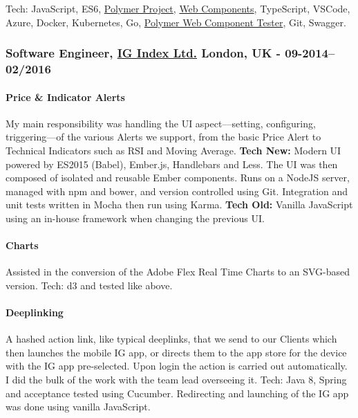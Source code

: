 \documentclass[
  a4paper,
]{article}
\begin{document}
Tech: JavaScript, ES6, \href{https://www.polymer-project.org}{Polymer
Project}, \href{https://www.webcomponents.org}{Web Components},
TypeScript, VSCode, Azure, Docker, Kubernetes, Go,
\href{https://github.com/Polymer/web-component-tester}{Polymer Web
Component Tester}, Git, Swagger.

\hypertarget{software-engineer-ig-index-ltd.-london-uk---09-2014022016}{%
\subsubsection{\texorpdfstring{Software Engineer,
\href{https://www.ig.com/uk}{IG Index Ltd.} London, UK -
09-2014--02/2016}{Software Engineer, IG Index Ltd. London, UK - 09-2014--02/2016}}\label{software-engineer-ig-index-ltd.-london-uk---09-2014022016}}

\hypertarget{price-indicator-alerts}{%
\paragraph{Price \& Indicator Alerts}\label{price-indicator-alerts}}

My main responsibility was handling the UI aspect---setting,
configuring, triggering---of the various Alerts we support, from the
basic Price Alert to Technical Indicators such as RSI and Moving
Average. \textbf{Tech New:} Modern UI powered by ES2015 (Babel),
Ember.js, Handlebars and Less. The UI was then composed of isolated and
reusable Ember components. Runs on a NodeJS server, managed with npm and
bower, and version controlled using Git. Integration and unit tests
written in Mocha then run using Karma. \textbf{Tech Old:} Vanilla
JavaScript using an in-house framework when changing the previous UI.

\hypertarget{charts}{%
\paragraph{Charts}\label{charts}}

Assisted in the conversion of the Adobe Flex Real Time Charts to an
SVG-based version. Tech: d3 and tested like above.

\hypertarget{deeplinking}{%
\paragraph{Deeplinking}\label{deeplinking}}

A hashed action link, like typical deeplinks, that we send to our
Clients which then launches the mobile IG app, or directs them to the
app store for the device with the IG app pre-selected. Upon login the
action is carried out automatically. I did the bulk of the work with the
team lead overseeing it. Tech: Java 8, Spring and acceptance tested
using Cucumber. Redirecting and launching of the IG app was done using
vanilla JavaScript.
\end{document}
